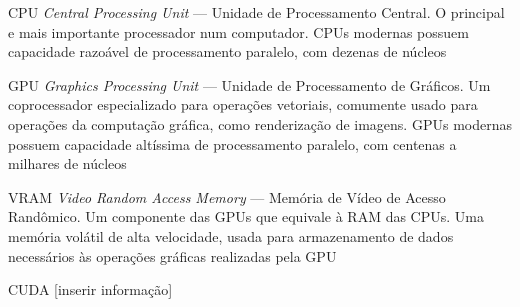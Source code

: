 \documentclass[12pt, %
openright, 
oneside, %
a4paper,    %
brazil]{facom-ufu-abntex2}
\begin{document}
\begin{siglas} %
  \item[CPU] \textit{Central Processing Unit} --- Unidade de Processamento Central. O principal e mais importante processador num computador. CPUs modernas possuem capacidade razoável de processamento paralelo, com dezenas de núcleos
  \item[GPU] \textit{Graphics Processing Unit} --- Unidade de Processamento de Gráficos. Um coprocessador especializado para operações vetoriais, comumente usado para operações da computação gráfica, como renderização de imagens. GPUs modernas possuem capacidade altíssima de processamento paralelo, com centenas a milhares de núcleos
  \item[VRAM] \textit{Video Random Access Memory} --- Memória de Vídeo de Acesso Randômico. Um componente das GPUs que equivale à RAM das CPUs. Uma memória volátil de alta velocidade, usada para armazenamento de dados necessários às operações gráficas realizadas pela GPU
  \item[CUDA] [inserir informação]
\end{siglas}


\tableofcontents*
\cleardoublepage





\textual

\end{document}
